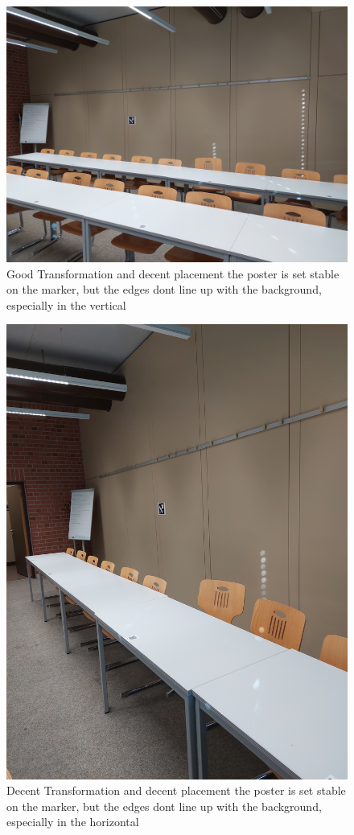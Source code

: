 \documentclass[a4paper,twocolumn]{article}
\begin{document}
    \begin{figure}[htbp]
    \centering
    \includegraphics[width=0.9\columnwidth]{img/20221115_113401.jpg} %
    \caption{Good Transformation and decent placement the poster is set stable on the marker, but the edges dont line up with the background, especially in the vertical}
    \label{fig:20221115_113401.jpg}
    \end{figure}
    \begin{figure}[htbp]
    \centering
    \includegraphics[width=0.9\columnwidth]{img/20221115_113412.jpg} %
    \caption{Decent Transformation and decent placement the poster is set stable on the marker, but the edges dont line up with the background, especially in the horizontal}
    \label{fig:20221115_113412.jpg}
    \end{figure}
    
\end{document}
